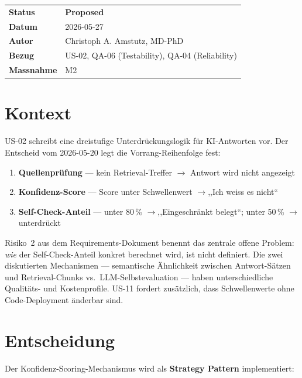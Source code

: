 \documentclass[a4paper, 11pt, oneside]{report}
\newcommand{\ra}{$\rightarrow$\xspace}
\newcommand{\statusProposed}{%
  \colorbox{statusproposed!28}{\small\bfseries\color{statusproposed!70!black}\;Proposed\;}}
\begin{document}
\begin{tcolorbox}[enhanced, colback=adrlightblue, colframe=adrblue,
  boxrule=0.9pt, arc=3pt, left=8pt, right=8pt, top=6pt, bottom=6pt]
\begin{tabular}{@{}L{3.2cm}L{11.5cm}@{}}
\textbf{Status}     & \statusProposed \\[3pt]
\textbf{Datum}      & 2026-05-27 \\[3pt]
\textbf{Autor}      & Christoph A. Amstutz, MD-PhD \\[3pt]
\textbf{Bezug}      & US-02, QA-06 (Testability), QA-04 (Reliability) \\[3pt]
\textbf{Massnahme}  & M2 \\
\end{tabular}
\end{tcolorbox}

\section{Kontext}

US-02 schreibt eine dreistufige Unterdrückungslogik für KI-Antworten vor.
Der Entscheid vom 2026-05-20 legt die Vorrang-Reihenfolge fest:

\begin{enumerate}
  \item \textbf{Quellenprüfung} --- kein Retrieval-Treffer \ra Antwort wird nicht angezeigt
  \item \textbf{Konfidenz-Score} --- Score unter Schwellenwert \ra ,,Ich weiss es nicht``
  \item \textbf{Self-Check-Anteil} --- unter 80\,\% \ra ,,Eingeschränkt belegt``;
        unter 50\,\% \ra unterdrückt
\end{enumerate}

Risiko~2 aus dem Requirements-Dokument benennt das zentrale offene Problem:
\textit{wie} der Self-Check-Anteil konkret berechnet wird, ist nicht definiert.
Die zwei diskutierten Mechanismen --- semantische Ähnlichkeit zwischen
Antwort-Sätzen und Retrieval-Chunks vs.\ LLM-Selbstevaluation --- haben
unterschiedliche Qualitäts- und Kostenprofile. US-11 fordert zusätzlich,
dass Schwellenwerte ohne Code-Deployment änderbar sind.

\section{Entscheidung}

Der Konfidenz-Scoring-Mechanismus wird als \textbf{Strategy Pattern} implementiert:
\end{document}
